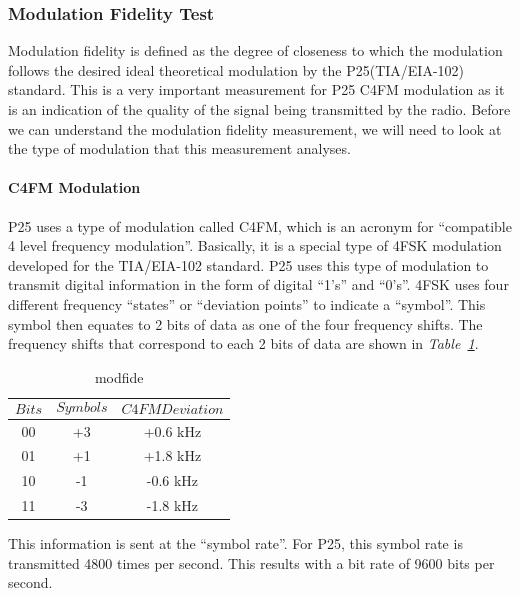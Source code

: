 \subsubsection{Modulation Fidelity Test}
\- \indent

	Modulation fidelity is defined as the degree of closeness to which the modulation follows the desired ideal theoretical modulation by the P25(TIA/EIA-102) standard\cite{fidelity}. This is a very important measurement for P25 C4FM modulation as it is an indication of the quality of the signal being transmitted by the radio. Before we can understand the
modulation fidelity measurement, we will need to look at the type
of modulation that this measurement analyses.

\paragraph{C4FM Modulation}
\- \indent

	P25 uses a type of modulation called C4FM, which is an acronym for “compatible 4 level frequency modulation”\cite{fidelity}. Basically, it is a special type of 4FSK modulation developed for the TIA/EIA-102 standard. P25 uses this type of modulation to transmit digital information in the form of digital “1’s” and “0’s”. 4FSK uses four different frequency “states” or “deviation points” to indicate a “symbol”. This symbol then equates to 2 bits of data as one of the four frequency shifts. The frequency shifts that correspond to each 2 bits of data are shown in \textit{Table~\ref{tab:modfide}}.
	
\begin{table}[H]
  \centering
 
    \begin{tabular}{c|c|c}
       $$Bits$$ & $$Symbols$$ & $$C4FM Deviation$$ \\ \hline
       00 & +3 & +0.6 kHz  \\ \hline
       01 & +1 & +1.8 kHz  \\ \hline
       10 & -1 & -0.6 kHz  \\ \hline
       11 & -3 & -1.8 kHz  
      
  \end{tabular}
  \caption{modfide}
  \label{tab:modfide}
\end{table}

	This information is sent at the “symbol rate”. For P25, this symbol rate is transmitted 4800 times per second. This results  with a bit rate of 9600 bits per second. 
		
